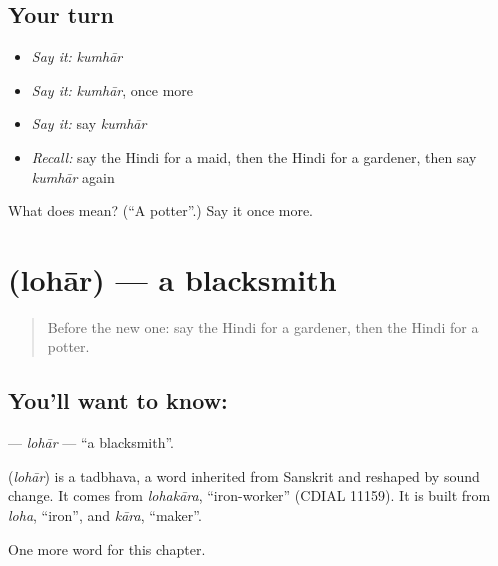 \subsection*{Your turn}
\begin{itemize}
\raggedright
  \item \emph{Say it:} \emph{kumhār}
  \item \emph{Say it:} \emph{kumhār}, once more
  \item \emph{Say it:} say \emph{kumhār}
  \item \emph{Recall:} say the Hindi for a maid, then the Hindi for a gardener, then say \emph{kumhār} again
\end{itemize}

\begin{tcolorbox}[breakable,colback=teal!4,colframe=teal!35!black,title={Before you move on}]
What does  mean? (\textquotedblleft{}A potter\textquotedblright{}.) Say it once more.
\end{tcolorbox}
\section[\texorpdfstring{\hi{लोहार} (lohār)}{लोहार (lohār)}]{ (lohār) — a blacksmith}

\label{lesson:HI-C261-lohar}



\begin{quote}
Before the new one: say the Hindi for a gardener, then the Hindi for a potter.
\end{quote}

\subsection*{You'll want to know: }
\textbf{} — \emph{lohār} — \textquotedblleft{}a blacksmith\textquotedblright{}.

\begin{cousinweb}
\textbf{} (\emph{lohār}) is a tadbhava, a word inherited from Sanskrit and reshaped by sound change. It comes from \emph{lohakāra}, \textquotedblleft{}iron-worker\textquotedblright{} (CDIAL 11159). It is built from \emph{loha}, \textquotedblleft{}iron\textquotedblright{}, and \emph{kāra}, \textquotedblleft{}maker\textquotedblright{}.
\end{cousinweb}

\begin{grammarlens}[title={What you've built}]
One more word for this chapter.
\end{grammarlens}

